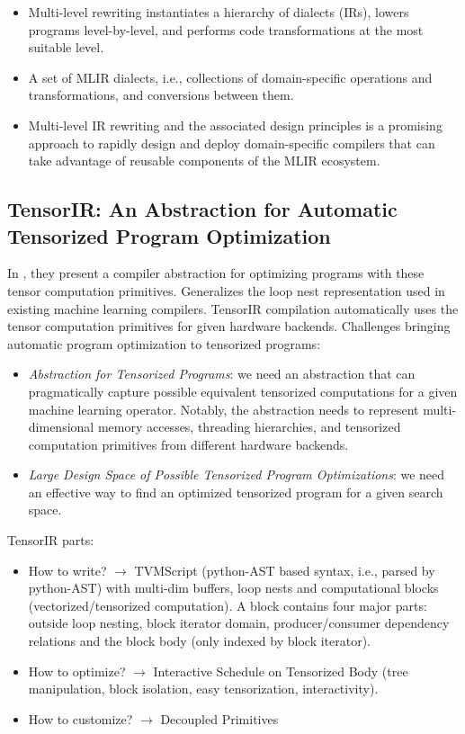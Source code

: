 \begin{itemize}
    \item Multi-level rewriting instantiates a hierarchy of dialects (IRs), lowers programs level-by-level, and performs code transformations at the most suitable level.
    \item A set of MLIR dialects, i.e., collections of domain-specific operations and transformations, and conversions between them.
    \item Multi-level IR rewriting and the associated design principles is a promising approach to rapidly design and deploy domain-specific compilers that can take advantage of reusable components of the MLIR ecosystem.
\end{itemize}

\subsection{TensorIR: An Abstraction for Automatic Tensorized Program Optimization}
In \cite{Feng2022TensorIRAA}, they present a compiler abstraction for optimizing programs with these tensor computation primitives. Generalizes the loop nest representation used in existing machine learning compilers. TensorIR compilation automatically uses the tensor computation primitives for given hardware backends. Challenges bringing automatic program optimization to tensorized programs:
\begin{itemize}
    \item \textit{Abstraction for Tensorized Programs}: we need an abstraction that can pragmatically capture possible equivalent tensorized computations for a given machine learning operator. Notably, the abstraction needs to represent multi-dimensional memory accesses, threading hierarchies, and tensorized computation primitives from different hardware backends.
    \item \textit{Large Design Space of Possible Tensorized Program Optimizations}: we need an effective way to find an optimized tensorized program for a given search space.
\end{itemize}
TensorIR parts:
\begin{itemize}
    \item How to write? $\rightarrow$ TVMScript (python-AST based syntax, i.e., parsed by python-AST) with multi-dim buffers, loop nests and computational blocks (vectorized/tensorized computation). A block contains four major parts: outside loop nesting, block iterator domain, producer/consumer dependency relations and the block body (only indexed by block iterator).
    \item How to optimize? $\rightarrow$ Interactive Schedule on Tensorized Body (tree manipulation, block isolation, easy tensorization, interactivity).
    \item How to customize? $\rightarrow$ Decoupled Primitives
\end{itemize}

